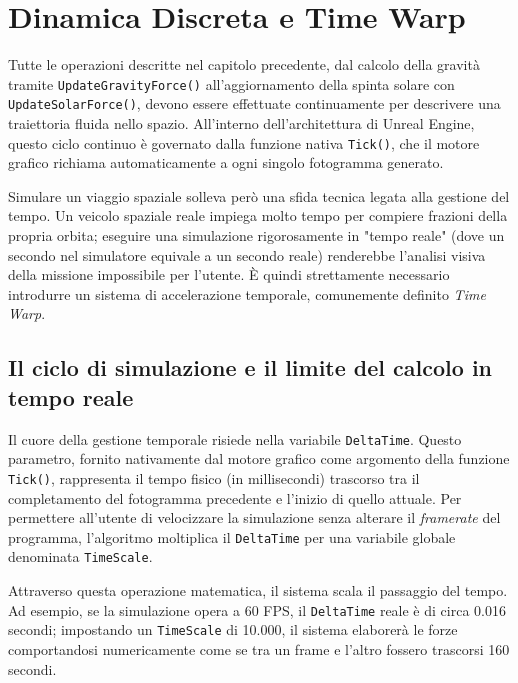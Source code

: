 \chapter{Dinamica Discreta e Time Warp}
\label{chap:dinamica_discreta}

Tutte le operazioni descritte nel capitolo precedente, dal calcolo della gravità tramite \lstinline|UpdateGravityForce()| all'aggiornamento della spinta solare con \lstinline|UpdateSolarForce()|, devono essere effettuate continuamente per descrivere una traiettoria fluida nello spazio. All'interno dell'architettura di Unreal Engine, questo ciclo continuo è governato dalla funzione nativa \lstinline|Tick()|, che il motore grafico richiama automaticamente a ogni singolo fotogramma generato.

Simulare un viaggio spaziale solleva però una sfida tecnica legata alla gestione del tempo. Un veicolo spaziale reale impiega molto tempo per compiere frazioni della propria orbita; eseguire una simulazione rigorosamente in "tempo reale" (dove un secondo nel simulatore equivale a un secondo reale) renderebbe l'analisi visiva della missione impossibile per l'utente. È quindi strettamente necessario introdurre un sistema di accelerazione temporale, comunemente definito \textit{Time Warp}.


\section{Il ciclo di simulazione e il limite del calcolo in tempo reale}

Il cuore della gestione temporale risiede nella variabile \lstinline|DeltaTime|. Questo parametro, fornito nativamente dal motore grafico come argomento della funzione \lstinline|Tick()|, rappresenta il tempo fisico (in millisecondi) trascorso tra il completamento del fotogramma precedente e l'inizio di quello attuale. Per permettere all'utente di velocizzare la simulazione senza alterare il \textit{framerate} del programma, l'algoritmo moltiplica il \lstinline|DeltaTime| per una variabile globale denominata \lstinline|TimeScale|.

Attraverso questa operazione matematica, il sistema scala il passaggio del tempo. Ad esempio, se la simulazione opera a 60 FPS, il \lstinline|DeltaTime| reale è di circa 0.016 secondi; impostando un \lstinline|TimeScale| di 10.000, il sistema elaborerà le forze comportandosi numericamente come se tra un frame e l'altro fossero trascorsi 160 secondi.

